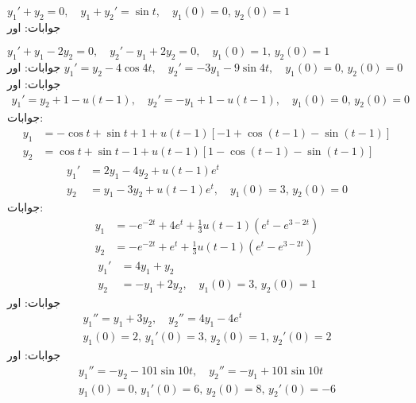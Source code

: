 \quad
$y_1'+y_2=0,\quad y_1+y_2'=\sin t,\quad y_1(0)=0,\, y_2(0)=1$\\
جوابات: اور 

\quad
$y_1'+y_1-2y_2=0,\quad y_2'-y_1+2y_2=0,\quad y_1(0)=1,\,y_2(0)=1$\\
جوابات: اور 
\quad
$y_1'=y_2-4\cos 4t,\quad y_2'=-3y_1-9\sin 4t,\quad y_1(0)=0,\, y_2(0)=0$\\
جوابات: اور 
\begin{align*}
y_1'=y_2+1-u(t-1),\quad y_2'=-y_1+1-u(t-1),\quad y_1(0)=0,\, y_2(0)=0
\end{align*}
جوابات:
\begin{align*}
y_1&=-\cos t+\sin t+1+u(t-1)[-1+\cos(t-1)-\sin(t-1)]\\
y_2&=\cos t+\sin t-1+u(t-1)[1-\cos(t-1)-\sin(t-1)]
\end{align*}
\begin{align*}
y_1'&=2y_1-4y_2+u(t-1)e^t\\
y_2&=y_1-3y_2+u(t-1)e^t,\quad y_1(0)=3, \, y_2(0)=0
\end{align*}
جوابات:
\begin{align*}
y_1&=-e^{-2t}+4e^t+\frac{1}{3}u(t-1)(e^t-e^{3-2t})\\
y_2&=-e^{-2t}+e^t+\frac{1}{3}u(t-1)(e^t-e^{3-2t})
\end{align*}
\begin{align*}
y_1'&=4y_1+y_2\\
y_2&=-y_1+2y_2,\quad y_1(0)=3,\, y_2(0)=1
\end{align*}
جوابات: اور 
\begin{align*}
y_1''=y_1+3y_2,\quad y_2''=4y_1-4e^t\\
y_1(0)=2,\, y_1'(0)=3,\, y_2(0)=1,\, y_2'(0)=2
\end{align*}
جوابات: اور 
\begin{align*}
y_1''=-y_2-101\sin 10t,\quad y_2''=-y_1+101\sin 10t\\
y_1(0)=0, \, y_1'(0)=6,\, y_2(0)=8,\, y_2'(0)=-6
\end{align*}
